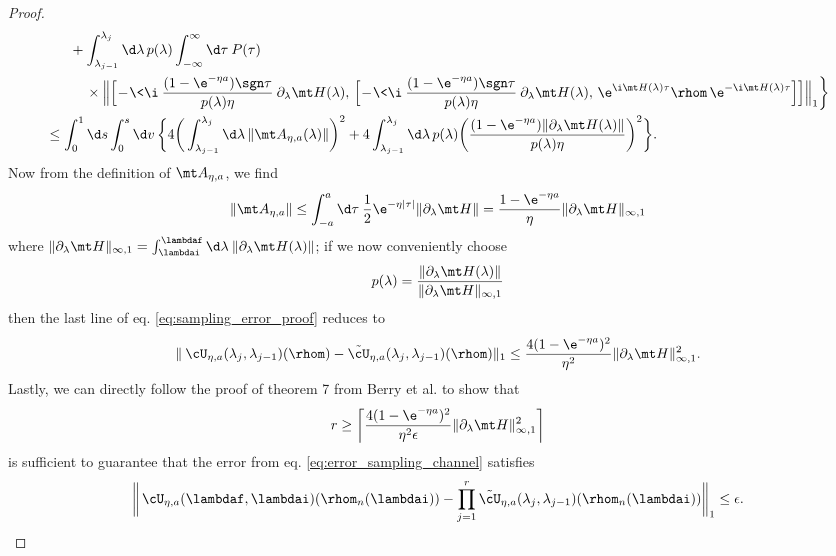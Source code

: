 \begin{proof}
\begin{align}
    &\hspace{6mm} + \int_{\lambda_{j-1}}^{\lambda_j} \d\lambda \, p(\lambda) \int_{-\infty}^\infty \d\tau \> P(\tau) \nonumber \\
    &\hspace{10mm} \times \Big\| \Big[ \!-\!\<\i \> \frac{(1 - \e^{-\eta a})\sgn\tau}{p(\lambda)\eta} \> \partial_\lambda \mt H(\lambda), \, \Big[ \!-\!\<\i \> \frac{(1 - \e^{-\eta a})\sgn\tau}{p(\lambda)\eta} \> \partial_\lambda \mt H(\lambda), \, \e^{\i \mt H(\lambda) \tau} \rhom \, \e^{-\i \mt H(\lambda) \tau} \Big] \Big] \Big\|_1 \bigg\} \nonumber \\
    &\leq \int_0^1 \d s \int_0^s \d v \, \bigg\{ 4 \bigg( \int_{\lambda_{j-1}}^{\lambda_j} \d\lambda \, \|\mt A_{\eta, a}(\lambda)\|\bigg)^2 + 4 \int_{\lambda_{j-1}}^{\lambda_j} \d\lambda \, p(\lambda) \bigg( \frac{(1 - \e^{-\eta a})\|\partial_\lambda \mt H(\lambda)\|}{p(\lambda)\eta} \bigg)^2 \bigg\}.
\end{align}
Now from the definition of $\mt A_{\eta, a}$, we find
\begin{align}
    \|\mt A_{\eta, a}\| \leq \int_{-a}^a \d\tau \> \frac12\e^{-\eta|\tau|} \|\partial_\lambda \mt H\| = \frac{1 - \e^{-\eta a}}\eta \|\partial_\lambda \mt H\|_{\infty, 1}
\end{align}
where $\|\partial_\lambda \mt H\|_{\infty, 1} = \int_\lambdai^\lambdaf \d\lambda \> \|\partial_\lambda \mt H(\lambda)\|$; if we now conveniently choose
\begin{align}
    p(\lambda) = \frac{\|\partial_\lambda \mt H(\lambda)\|}{\|\partial_\lambda \mt H\|_{\infty, 1}}
\end{align}
then the last line of eq. \ref{eq:sampling_error_proof} reduces to
\begin{align}
    \|\> \cU_{\eta, a}(\lambda_j, \lambda_{j-1})(\rhom) - \tilde\cU_{\eta, a}(\lambda_j, \lambda_{j-1})(\rhom)\|_1 \leq \frac{4(1 - \e^{-\eta a})^2}{\eta^2} \|\partial_\lambda \mt H\|_{\infty, 1}^2.
\end{align}
Lastly, we can directly follow the proof of theorem 7 from Berry et al. \cite{Berry2020} to show that
\begin{align}\label{eq:r_for_U_eta,a}
    r \geq \bigg\lceil \frac{4(1 - \e^{-\eta a})^2}{\eta^2\epsilon} \|\partial_\lambda \mt H\|_{\infty, 1}^2 \bigg\rceil
\end{align}
is sufficient to guarantee that the error from eq. \ref{eq:error_sampling_channel} satisfies
\begin{align}
    \bigg\| \, \cU_{\eta, a}(\lambdaf, \lambdai)(\rhom_n(\lambdai)) - \prod_{j=1}^r \tilde\cU_{\eta, a}(\lambda_j, \lambda_{j-1})(\rhom_n(\lambdai)) \bigg\|_1 \leq \epsilon.
\end{align}
\end{proof}

